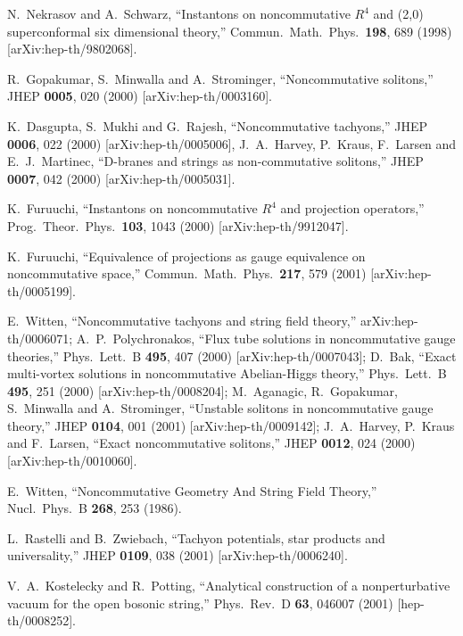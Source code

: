 \documentclass[a4paper,12pt]{article}
\begin{document}
\begin{thebibliography}{999}
N.~Nekrasov and A.~Schwarz,
``Instantons on noncommutative $R^4$ 
and (2,0) superconformal six  dimensional theory,''
Commun.\ Math.\ Phys.\  {\bf 198}, 689 (1998)
[arXiv:hep-th/9802068].


R.~Gopakumar, S.~Minwalla and A.~Strominger,
``Noncommutative solitons,''
JHEP {\bf 0005}, 020 (2000)
[arXiv:hep-th/0003160].






K.~Dasgupta, S.~Mukhi and G.~Rajesh,
``Noncommutative tachyons,''
JHEP {\bf 0006}, 022 (2000)
[arXiv:hep-th/0005006],
J.~A.~Harvey, P.~Kraus, F.~Larsen and E.~J.~Martinec,
``D-branes and strings as non-commutative solitons,''
JHEP {\bf 0007}, 042 (2000)
[arXiv:hep-th/0005031].





K.~Furuuchi,
``Instantons on noncommutative $R^4$ and projection operators,''
Prog.\ Theor.\ Phys.\  {\bf 103}, 1043 (2000)
[arXiv:hep-th/9912047].


K.~Furuuchi,
``Equivalence of projections as gauge equivalence on noncommutative space,''
Commun.\ Math.\ Phys.\  {\bf 217}, 579 (2001)
[arXiv:hep-th/0005199].

E.~Witten,
``Noncommutative tachyons and string field theory,''
arXiv:hep-th/0006071;
A.~P.~Polychronakos,
``Flux tube solutions in noncommutative gauge theories,''
Phys.\ Lett.\ B {\bf 495}, 407 (2000)
[arXiv:hep-th/0007043];
D.~Bak,
``Exact multi-vortex solutions in noncommutative Abelian-Higgs theory,''
Phys.\ Lett.\ B {\bf 495}, 251 (2000)
[arXiv:hep-th/0008204];
M.~Aganagic, R.~Gopakumar, S.~Minwalla and A.~Strominger,
``Unstable solitons in noncommutative gauge theory,''
JHEP {\bf 0104}, 001 (2001)
[arXiv:hep-th/0009142];
J.~A.~Harvey, P.~Kraus and F.~Larsen,
``Exact noncommutative solitons,''
JHEP {\bf 0012}, 024 (2000)
[arXiv:hep-th/0010060].


E.~Witten,
``Noncommutative Geometry And String Field Theory,''
Nucl.\ Phys.\ B {\bf 268}, 253 (1986).




L.~Rastelli and B.~Zwiebach,
``Tachyon potentials, star products and universality,''
JHEP {\bf 0109}, 038 (2001)
[arXiv:hep-th/0006240].

V.~A.~Kostelecky and R.~Potting,
``Analytical construction of a nonperturbative vacuum 
for the open  bosonic string,''
Phys.\ Rev.\ D {\bf 63}, 046007 (2001)
[hep-th/0008252].


\end{thebibliography}
\end{document}
